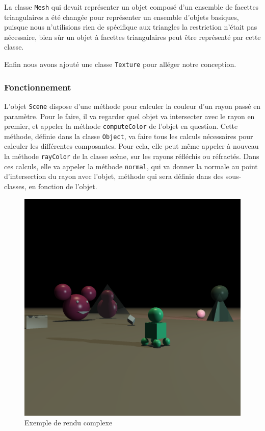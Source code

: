 \documentclass[a4paper]{article}
\begin{document}
      La classe \verb+Mesh+ qui
      devait représenter un objet composé d'un ensemble de facettes
      triangulaires a été changée pour représenter un ensemble d'objets
      basiques, puisque nous n'utilisions rien de spécifique aux triangles la
      restriction n'était pas nécessaire, bien sûr un objet à facettes
      triangulaires peut être représenté par cette classe.
      
      Enfin nous avons ajouté une classe \verb+Texture+ pour alléger notre
      conception.
    \subsubsection{Fonctionnement}
      L'objet \verb+Scene+ dispose d'une méthode pour calculer la couleur
      d'un rayon passé en paramètre.
      Pour le faire, il va regarder quel objet va intersecter avec le rayon en
      premier, et appeler la méthode \verb+computeColor+ de l'objet en question.
      Cette méthode, définie dans la classe \verb+Object+, va faire tous les
      calculs nécessaires pour calculer les différentes composantes. Pour cela,
      elle peut même appeler à nouveau la méthode \verb+rayColor+ de la classe
      scène, sur les rayons réfléchis ou réfractés.
      Dans ces calculs, elle va appeler la méthode \verb+normal+, qui va donner
      la normale au point d'intersection du rayon avec l'objet, méthode qui sera
      définie dans des sous-classes, en fonction de l'objet.
    \begin{figure}[p]
      \centerline{
        \includegraphics[width=1.2\textwidth]{0377.png}
      }
      \caption{Exemple de rendu complexe}
    \end{figure}
\end{document}
